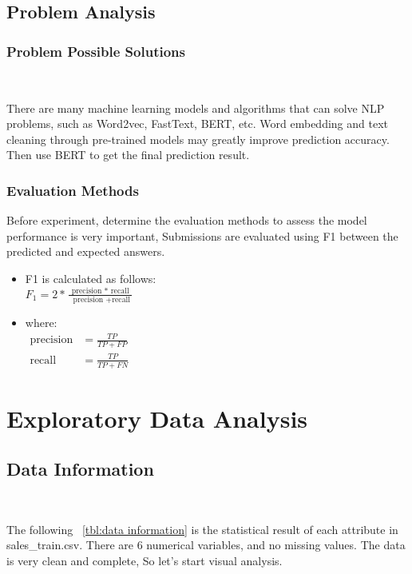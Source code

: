 \subsection{Problem Analysis}

\subsubsection{Problem Possible Solutions}
\

There are many machine learning models and algorithms 
that can solve NLP problems, such as Word2vec, 
FastText, BERT, etc. Word embedding and text cleaning 
through pre-trained models may greatly improve 
prediction accuracy. Then use BERT to 
get the final prediction result. 


\subsubsection{Evaluation Methods}


Before experiment, determine the evaluation methods
to assess the model performance is very important,
Submissions are evaluated using F1 
between the predicted and expected answers.

\begin{itemize}
	\item
	F1 is calculated as follows: \\[5 pt]
	$F _ { 1 } = 2 * \frac { \text { precision } * \text { recall } } { \text { precision } + \text {recall} }$
	\\[5 pt]
	\item
	where: \\[5 pt]
	$\begin{aligned} \text {precision} & = \frac { T P } { T P + F P } \\ \text {recall} & = \frac { T P } { T P + F N } \end{aligned}$
\end{itemize}


\section{Exploratory Data Analysis} \label{sec-data_exploration}

\subsection{Data Information}
\

The following  ~\cref{tbl:data information}
is the statistical result of each attribute in sales\_train.csv.
There are 6 numerical variables,
and no missing values.
The data is very clean and complete, So let's start visual analysis.




